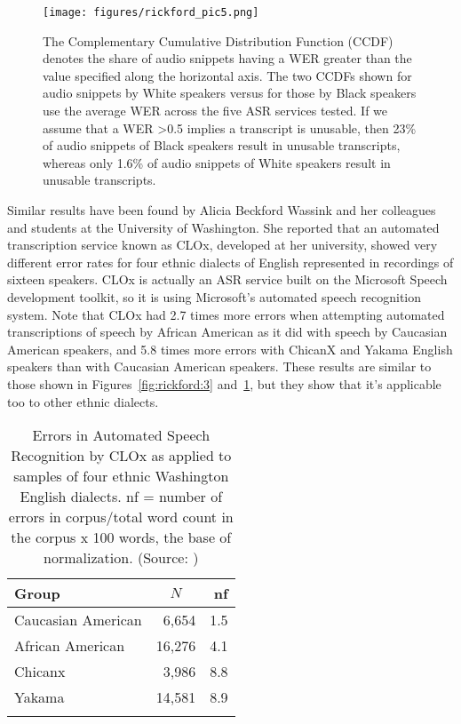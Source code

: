 \documentclass[output=paper,colorlinks,citecolor=brown]{langscibook}
\begin{document}
\begin{figure}
\texttt{[image: figures/rickford\_pic5.png]}
\caption{The Complementary Cumulative Distribution Function (CCDF) denotes the share of audio snippets having a WER greater than the value specified along the horizontal axis.  The two CCDFs shown for audio snippets by White speakers versus for those by Black speakers use the average WER across the five ASR services tested.  If we assume that a WER >0.5 implies a transcript is unusable, then 23\% of audio snippets of Black speakers result in unusable transcripts, whereas only 1.6\% of audio snippets of White speakers result in unusable transcripts.}
\label{fig:rickford:4}
\end{figure}

Similar results have been found by Alicia Beckford Wassink \citep{Wassink2020} and her colleagues and students at the University of Washington.  She reported that an automated transcription service known as CLOx, developed at her university, showed very different error rates for four ethnic dialects of English represented in recordings of sixteen speakers.  CLOx is actually an ASR service built on the Microsoft Speech development toolkit, so it is using Microsoft's automated speech recognition system. Note that CLOx had 2.7 times more errors when attempting automated transcriptions of speech by African American as it did with speech by Caucasian American speakers, and 5.8 times more errors with ChicanX and Yakama English speakers than with Caucasian American speakers.  These results are similar to those shown in Figures~\ref{fig:rickford:3} and~\ref{fig:rickford:4}, but they show that it’s applicable too to other ethnic dialects. 

\begin{table}
\begin{tabular}{lrr}
\lsptoprule
Group & \multicolumn{1}{c}{$N$} & nf \\\midrule
Caucasian American & 6,654 & 1.5 \\
African American & 16,276 & 4.1\\
Chicanx & 3,986 & 8.8 \\
Yakama & 14,581 & 8.9\\
\lspbottomrule
\end{tabular}
\caption{Errors in Automated Speech Recognition by CLOx as applied to samples of four ethnic Washington English dialects.  nf = number of errors in corpus/total word count in the corpus x 100 words, the base of normalization.  (Source: \citealt{Wassink2020})\label{tab:rickford:3}}
\end{table}
\end{document}
